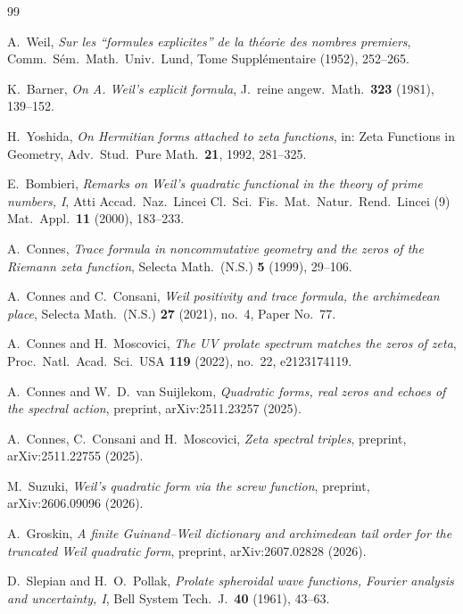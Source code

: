 ﻿\documentclass[11pt]{article}
\begin{document}
\begin{thebibliography}{99}

A.~Weil,
\emph{Sur les ``formules explicites'' de la th\'eorie des nombres
premiers},
Comm.\ S\'em.\ Math.\ Univ.\ Lund, Tome Suppl\'ementaire (1952),
252--265.

K.~Barner,
\emph{On A. Weil's explicit formula},
J.~reine angew.\ Math.\ \textbf{323} (1981), 139--152.

H.~Yoshida,
\emph{On Hermitian forms attached to zeta functions},
in: Zeta Functions in Geometry, Adv.\ Stud.\ Pure Math.\ \textbf{21},
1992, 281--325.

E.~Bombieri,
\emph{Remarks on Weil's quadratic functional in the theory of prime
numbers, I},
Atti Accad.\ Naz.\ Lincei Cl.\ Sci.\ Fis.\ Mat.\ Natur.\ Rend.\ Lincei
(9) Mat.\ Appl.\ \textbf{11} (2000), 183--233.

A.~Connes,
\emph{Trace formula in noncommutative geometry and the zeros of the
Riemann zeta function},
Selecta Math.\ (N.S.) \textbf{5} (1999), 29--106.

A.~Connes and C.~Consani,
\emph{Weil positivity and trace formula, the archimedean place},
Selecta Math.\ (N.S.) \textbf{27} (2021), no.~4, Paper No.~77.

A.~Connes and H.~Moscovici,
\emph{The UV prolate spectrum matches the zeros of zeta},
Proc.\ Natl.\ Acad.\ Sci.\ USA \textbf{119} (2022), no.~22,
e2123174119.

A.~Connes and W.~D.~van Suijlekom,
\emph{Quadratic forms, real zeros and echoes of the spectral action},
preprint, arXiv:2511.23257 (2025).

A.~Connes, C.~Consani and H.~Moscovici,
\emph{Zeta spectral triples},
preprint, arXiv:2511.22755 (2025).

M.~Suzuki,
\emph{Weil's quadratic form via the screw function},
preprint, arXiv:2606.09096 (2026).

A.~Groskin,
\emph{A finite Guinand--Weil dictionary and archimedean tail order for
the truncated Weil quadratic form},
preprint, arXiv:2607.02828 (2026).

D.~Slepian and H.~O.~Pollak,
\emph{Prolate spheroidal wave functions, Fourier analysis and
uncertainty, I},
Bell System Tech.\ J.\ \textbf{40} (1961), 43--63.


\end{thebibliography}
\end{document}
